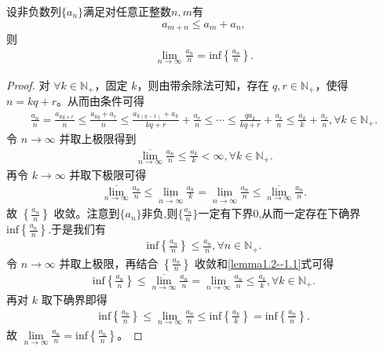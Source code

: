 \documentclass[../../main.tex]{subfiles}%
\begin{document}
\begin{lemma}\label{proposition:Fekete次可加性引理}
设非负数列\(\{a_{n}\}\)满足对任意正整数\(n,m\)有
\[a_{m + n}\leqslant  a_{m}+a_{n},\]
则
\begin{align*}
\underset{n\rightarrow \infty}{\lim}\frac{a_n}{n}=\mathrm{inf}\left\{ \frac{a_n}{n} \right\} .
\end{align*}
\end{lemma}
\begin{proof}
对 $\forall k\in \mathbb{N} _+$，固定 $k$，则由带余除法可知，存在 $q,r\in \mathbb{N} _+$，使得 $n=kq+r$。从而由条件可得
\begin{align*}
\frac{a_n}{n}=\frac{a_{kq+r}}{n}\leqslant \frac{a_{kq}+a_r}{n}\leqslant \frac{a_{k\left( q-1 \right)}+a_k}{kq+r}+\frac{a_r}{n}\leqslant \cdots \leqslant \frac{qa_k}{kq+r}+\frac{a_r}{n}\leqslant \frac{a_k}{k}+\frac{a_r}{n},\forall k\in \mathbb{N} _+.
\end{align*}
令 $n\rightarrow \infty$ 并取上极限得到
\begin{align}
\underset{n\rightarrow \infty}{\overline{\lim }}\frac{a_n}{n}\leqslant \frac{a_k}{k}<\infty ,\forall k\in \mathbb{N} _+.\label{lemma1.2--1.1}
\end{align}
再令 $k\rightarrow \infty$ 并取下极限可得
\begin{align*}
\underset{n\rightarrow \infty}{\overline{\lim }}\frac{a_n}{n}\leqslant \underset{n\rightarrow \infty}{\underline{\lim }}\frac{a_k}{k}=\underset{n\rightarrow \infty}{\underline{\lim }}\frac{a_n}{n}\leqslant \underset{n\rightarrow \infty}{\overline{\lim }}\frac{a_n}{n}.
\end{align*}
故 $\left\{ \frac{a_n}{n} \right\}$ 收敛。注意到$\{a_n\}$非负,则$\{\frac{a_n}{n}\}$一定有下界0,从而一定存在下确界$\mathrm{inf}\left\{ \frac{a_n}{n} \right\}$.于是我们有
\begin{align*}
\mathrm{inf}\left\{ \frac{a_n}{n} \right\} \leqslant \frac{a_n}{n},\forall n\in \mathbb{N} _+.
\end{align*}
令 $n\rightarrow \infty$ 并取上极限，再结合 $\left\{ \frac{a_n}{n} \right\}$ 收敛和\eqref{lemma1.2--1.1}式可得
\begin{align*}
\mathrm{inf}\left\{ \frac{a_n}{n} \right\} \leqslant \underset{n\rightarrow \infty}{\overline{\lim }}\frac{a_n}{n}=\underset{n\rightarrow \infty}{\lim}\frac{a_n}{n}\leqslant \frac{a_k}{k},\forall k\in \mathbb{N} _+.
\end{align*}
再对 $k$ 取下确界即得
\begin{align*}
\mathrm{inf}\left\{ \frac{a_n}{n} \right\} \leqslant \underset{n\rightarrow \infty}{\lim}\frac{a_n}{n}\leqslant \mathrm{inf}\left\{ \frac{a_k}{k} \right\} =\mathrm{inf}\left\{ \frac{a_n}{n} \right\} .
\end{align*}
故 $\underset{n\rightarrow \infty}{\lim}\frac{a_n}{n}=\mathrm{inf}\left\{ \frac{a_n}{n} \right\}$。
\end{proof}
\end{document}
